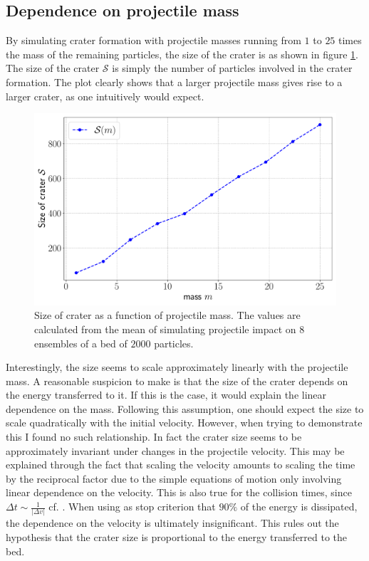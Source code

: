\subsection{Dependence on projectile mass}

By simulating crater formation with projectile masses running from $1$ to $25$ times the mass of the remaining particles, the size of the crater is as shown in figure \ref{fig:mass_size}. The size of the crater $\mathcal{S}$ is simply the number of particles involved in the crater formation. The plot clearly shows that a larger projectile mass gives rise to a larger crater, as one intuitively would expect. 

\begin{figure}
	\centering
	\includegraphics[width=\columnwidth]{../fig/mass_size}
	\caption{Size of crater as a function of projectile mass. The values are calculated from the mean of simulating projectile impact on $8$ ensembles of a bed of $2000$ particles.}
	\label{fig:mass_size}
\end{figure}

Interestingly, the size seems to scale approximately linearly with the projectile mass. A reasonable suspicion to make is that the size of the crater depends on the energy transferred to it. If this is the case, it would explain the linear dependence on the mass. Following this assumption, one should expect the size to scale quadratically with the initial velocity. However, when trying to demonstrate this I found no such relationship. In fact the crater size seems to be approximately invariant under changes in the projectile velocity. This may be explained through the fact that scaling the velocity amounts to scaling the time by the reciprocal factor due to the simple equations of motion only involving linear dependence on the velocity. This is also true for the collision times, since $\Delta t \sim \frac{1}{|\Delta v|}$ cf. \cite{sheet}. When using as stop criterion that $90 \%$ of the energy is dissipated, the dependence on the velocity is ultimately insignificant. This rules out the hypothesis that the crater size is proportional to the energy transferred to the bed.


